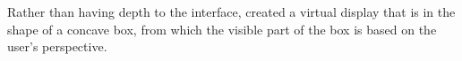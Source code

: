 Rather than having depth to the interface, \cite{lopez2012head} created a virtual display that is in the shape of a concave box, from which the visible part of the box is based on the user's perspective.\\ %








